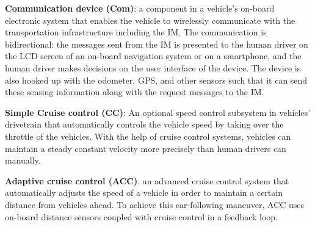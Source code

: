 \begin{small_ind_s_itemize}

\item \textbf{Communication device (Com)}:
a component in a vehicle's on-board electronic system that enables the
vehicle to wirelessly communicate with the transportation
infrastructure including the IM.  The communication is bidirectional:
the messages sent from the IM is presented to the human driver on
the LCD screen of an on-board navigation system or on a smartphone, and
the human driver makes decisions on the user interface of the device.
The device is also hooked up with the odometer, GPS, and other sensors
such that it can send these sensing information along with the request
messages to the IM.

\item \textbf{Simple Cruise control (CC)}:
An optional speed control subsystem in vehicles' drivetrain that
automatically controls the vehicle speed by taking over the throttle
of the vehicles.  With the help of cruise control systems, vehicles
can maintain a steady constant velocity more precisely than human
drivers can manually.

\item \textbf{Adaptive cruise control (ACC)}:
an advanced cruise control system that automatically adjusts the speed
of a vehicle in order to maintain a certain distance from vehicles
ahead. To achieve this car-following maneuver,
ACC uses on-board distance sensors coupled with cruise control
in a feedback loop.









\end{small_ind_s_itemize}

